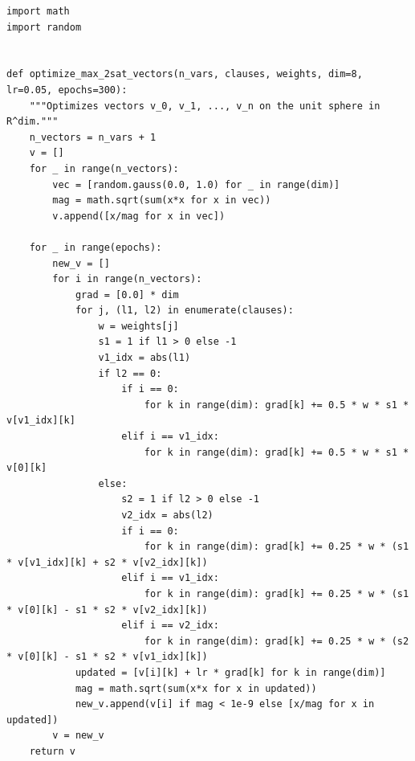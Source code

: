 \begin{lstlisting}[style=python, caption=SDP Max 2-SAT Algorithm]
import math
import random


def optimize_max_2sat_vectors(n_vars, clauses, weights, dim=8, lr=0.05, epochs=300):
    """Optimizes vectors v_0, v_1, ..., v_n on the unit sphere in R^dim."""
    n_vectors = n_vars + 1
    v = []
    for _ in range(n_vectors):
        vec = [random.gauss(0.0, 1.0) for _ in range(dim)]
        mag = math.sqrt(sum(x*x for x in vec))
        v.append([x/mag for x in vec])
        
    for _ in range(epochs):
        new_v = []
        for i in range(n_vectors):
            grad = [0.0] * dim
            for j, (l1, l2) in enumerate(clauses):
                w = weights[j]
                s1 = 1 if l1 > 0 else -1
                v1_idx = abs(l1)
                if l2 == 0:
                    if i == 0:
                        for k in range(dim): grad[k] += 0.5 * w * s1 * v[v1_idx][k]
                    elif i == v1_idx:
                        for k in range(dim): grad[k] += 0.5 * w * s1 * v[0][k]
                else:
                    s2 = 1 if l2 > 0 else -1
                    v2_idx = abs(l2)
                    if i == 0:
                        for k in range(dim): grad[k] += 0.25 * w * (s1 * v[v1_idx][k] + s2 * v[v2_idx][k])
                    elif i == v1_idx:
                        for k in range(dim): grad[k] += 0.25 * w * (s1 * v[0][k] - s1 * s2 * v[v2_idx][k])
                    elif i == v2_idx:
                        for k in range(dim): grad[k] += 0.25 * w * (s2 * v[0][k] - s1 * s2 * v[v1_idx][k])
            updated = [v[i][k] + lr * grad[k] for k in range(dim)]
            mag = math.sqrt(sum(x*x for x in updated))
            new_v.append(v[i] if mag < 1e-9 else [x/mag for x in updated])
        v = new_v
    return v
\end{lstlisting}

